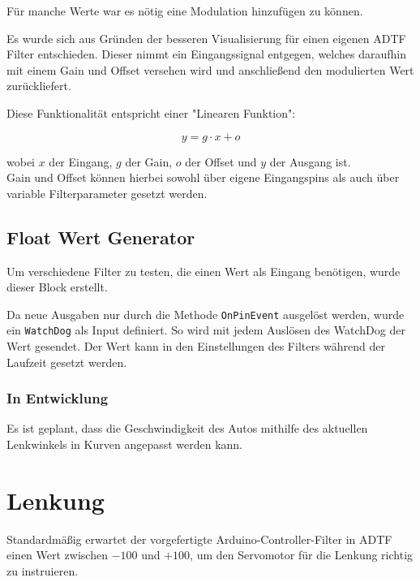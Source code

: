 \documentclass[a4paper,12pt]{report}
\begin{document}
	Für manche Werte war es nötig eine Modulation hinzufügen zu können.

	Es wurde sich aus Gründen der besseren Visualisierung für einen eigenen ADTF Filter entschieden.
	Dieser nimmt ein Eingangssignal entgegen, welches daraufhin mit einem Gain und Offset versehen wird und anschließend den modulierten Wert zurückliefert.

	Diese Funktionalität entspricht einer "Linearen Funktion":

	\[y = g \cdot x + o\]

	wobei $x$ der Eingang, $g$ der Gain, $o$ der Offset und $y$ der Ausgang ist.
	\\
	Gain und Offset können hierbei sowohl über eigene Eingangspins als auch über variable Filterparameter gesetzt werden.


\section{Float Wert Generator}

	Um verschiedene Filter zu testen, die einen Wert als Eingang benötigen, wurde dieser Block erstellt.

	Da neue Ausgaben nur durch die Methode \texttt{OnPinEvent} ausgelöst werden, wurde ein \texttt{WatchDog} als Input definiert. So wird mit jedem Auslösen des WatchDog der Wert gesendet. Der Wert kann in den Einstellungen des Filters während der Laufzeit gesetzt werden.


\subsection{In Entwicklung}

	Es ist geplant, dass die Geschwindigkeit des Autos mithilfe des aktuellen Lenkwinkels in Kurven angepasst werden kann.

\chapter{Lenkung}


	Standardmäßig erwartet der vorgefertigte Arduino-Controller-Filter in ADTF einen Wert zwischen $-100$ und $+100$, um den Servomotor für die Lenkung richtig zu instruieren.
\end{document}
